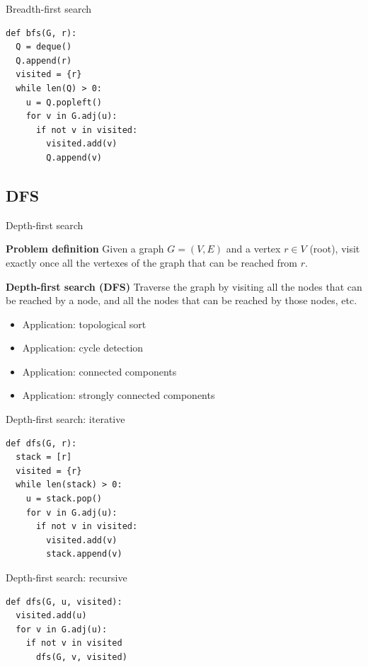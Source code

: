 \documentclass[compress]{beamer}
\begin{document}
\begin{frame}[fragile]{Breadth-first search}
\begin{lstlisting}
def bfs(G, r):
  Q = deque()
  Q.append(r)
  visited = {r}
  while len(Q) > 0:
    u = Q.popleft()
    for v in G.adj(u):
      if not v in visited:
        visited.add(v)
        Q.append(v)
\end{lstlisting}
\end{frame}

\subsection{DFS}
\begin{frame}{Depth-first search}
  \begin{block}{\textbf{Problem definition}}
    Given a graph $G = (V, E)$ and a vertex $r \in V$ (root), visit exactly once all the vertexes of the graph that can be reached from $r$.
  \end{block}
  \begin{block}{\textbf{Depth-first search (DFS)}}
    Traverse the graph by visiting all the nodes that can be reached by a node, and all the nodes that can be reached by those nodes, etc.
    \begin{itemize}
    \item Application: topological sort
    \item Application: cycle detection
    \item Application: connected components
    \item Application: strongly connected components
    \end{itemize}
  \end{block}
\end{frame}

\begin{frame}[fragile]{Depth-first search: iterative}
\begin{lstlisting}
def dfs(G, r):
  stack = [r]
  visited = {r}
  while len(stack) > 0:
    u = stack.pop()
    for v in G.adj(u):
      if not v in visited:
        visited.add(v)
        stack.append(v)
\end{lstlisting}
\end{frame}

\begin{frame}[fragile]{Depth-first search: recursive}
\begin{lstlisting}
def dfs(G, u, visited):
  visited.add(u)
  for v in G.adj(u):
    if not v in visited
      dfs(G, v, visited)
\end{lstlisting}
\end{frame}
\end{document}
